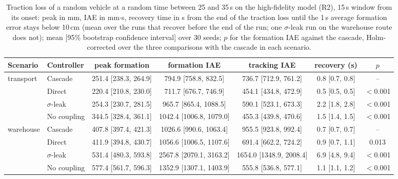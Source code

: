\begin{table}[!t]\centering\footnotesize
\caption{Traction loss of a random vehicle at a random time between 25 and 35\,s on the high-fidelity model (R2), 15\,s window from its onset: peak in mm, IAE in mm$\cdot$s, recovery time in s from the end of the traction loss until the 1\,s average formation error stays below 10\,cm (mean over the runs that recover before the end of the run; one $\sigma$-leak run on the warehouse route does not); mean [95\% bootstrap confidence interval] over 30 seeds; $p$ for the formation IAE against the cascade, Holm-corrected over the three comparisons with the cascade in each scenario.}\label{tab:r2_event}
\begin{adjustbox}{max width=\textwidth}
\begin{tabular}{@{}llccccc@{}}\toprule
Scenario & Controller & peak formation & formation IAE & tracking IAE & recovery (s) & $p$\\\midrule
transport & Cascade & 251.4 [238.3, 264.9] & 794.9 [758.8, 832.5] & 736.7 [712.9, 761.2] & 0.8 [0.7, 0.8] & --\\
 & Direct & 220.4 [210.8, 230.0] & 711.7 [676.7, 746.9] & 454.1 [434.8, 472.9] & 0.5 [0.5, 0.5] & $<$0.001\\
 & $\sigma$-leak & 254.3 [230.7, 281.5] & 965.7 [865.4, 1088.5] & 590.1 [523.1, 673.3] & 2.2 [1.8, 2.8] & $<$0.001\\
 & No coupling & 344.5 [328.4, 361.1] & 1042.4 [1006.8, 1079.0] & 455.3 [439.8, 470.6] & 1.5 [1.4, 1.5] & $<$0.001\\
\addlinespace
warehouse & Cascade & 407.8 [397.4, 421.3] & 1026.6 [990.6, 1063.4] & 955.5 [923.8, 992.4] & 0.7 [0.7, 0.7] & --\\
 & Direct & 411.9 [394.8, 430.7] & 1056.6 [1006.5, 1107.6] & 691.4 [662.2, 724.2] & 0.9 [0.7, 1.1] & 0.013\\
 & $\sigma$-leak & 531.4 [480.3, 593.8] & 2567.8 [2070.1, 3163.2] & 1654.0 [1348.9, 2008.4] & 6.9 [4.8, 9.4] & $<$0.001\\
 & No coupling & 577.4 [561.7, 596.3] & 1352.9 [1307.1, 1403.9] & 555.8 [536.8, 577.1] & 1.1 [1.1, 1.2] & $<$0.001\\
\bottomrule\end{tabular}
\end{adjustbox}
\end{table}
